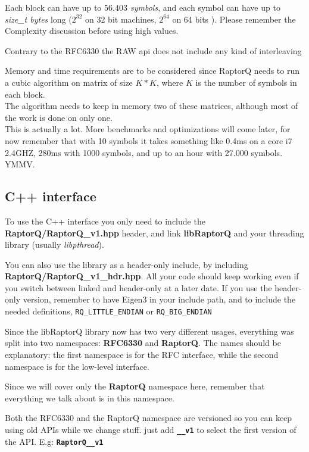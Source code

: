 \documentclass[11pt,a4paper]{refart}
\begin{document}
 Each block can have up to \textit{$56.403$ symbols}, and each
symbol can have up to \textit{size\_t bytes} long ($2^{32}$ on 32 bit machines, $2^{
	64}$ on 64 bits
). Please remember the Complexity discussion before using high values.


Contrary to the RFC6330 the RAW api does not include any kind of interleaving

Memory and time requirements are to be considered since RaptorQ needs to run a cubic algorithm on matrix of size $K*K$, where $K$ is the number of symbols in each block.\\
The algorithm needs to keep in memory two of these matrices, although most of the work is done on only one.\\
This is actually a lot. More benchmarks and optimizations will come later, for now remember that with 10 symbols it takes something like 0.4ms on a core i7 2.4GHZ, 280ms with 1000 symbols, and up to an hour with 27.000 symbols. YMMV.


\subsection{C++ interface}
To use the C++ interface you only need to include the \textbf{RaptorQ/RaptorQ\_v1.hpp} header, and link \textbf{libRaptorQ} and your threading library (usually \textit{libpthread}).

You can also use the library as a header-only include, by including \textbf{RaptorQ/RaptorQ\_v1\_hdr.hpp}. All your code should keep working even if you switch between linked and header-only at a later date. If you use the header-only version, remember to have Eigen3 in your include path, and to include the needed definitions, \texttt{RQ\_LITTLE\_ENDIAN} or \texttt{RQ\_BIG\_ENDIAN}

Since the libRaptorQ library now has two very different usages, everything was split into two namespaces: \textbf{RFC6330} and \textbf{RaptorQ}. The names should be explanatory: the first namespace is for the RFC interface, while the second namespace is for the low-level interface.

Since we will cover only the \textbf{RaptorQ} namespace here, remember that everything we talk about is in this namespace.

Both the RFC6330 and the RaptorQ namespace are versioned so you can keep using old APIs while we change stuff. just add \textbf{\texttt{\_\_v1}} to select the first version of the API. E.g: \textbf{\texttt{RaptorQ\_\_v1}}
\end{document}
